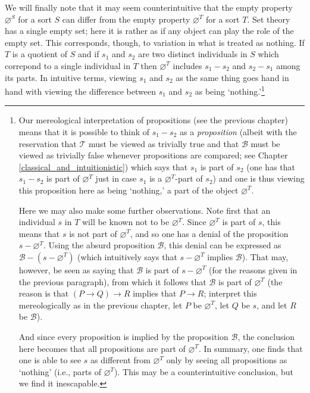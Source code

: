 \documentclass[12pt]{book}
\begin{document}
We will finally note that it may seem counterintuitive that the empty property $\varnothing^S$ for a sort $S$ can differ from the empty property $\varnothing^T$ for a sort $T$. Set theory has a single empty set; here it is rather as if any object can play the role of the empty set. This corresponds, though, to variation in what is treated as nothing. If $T$ is a quotient of $S$ and if $s_1$ and $s_2$ are two distinct individuals in $S$ which correpond to a single individual in $T$ then $\varnothing^T$ includes $s_1 - s_2$ and $s_2 - s_1$ among its parts. In intuitive terms, viewing $s_1$ and $s_2$ as the same thing goes hand in hand with viewing the difference between $s_1$ and $s_2$ as being `nothing.'\footnote{Our mereological interpretation of propositions (see the previous chapter) means that it is possible to think of $s_1 - s_2$ as a \textit{proposition} (albeit with the reservation that $\mathcal{T}$ must be viewed as trivially true and that $\mathcal{B}$ must be viewed as trivially false whenever propositions are compared; see Chapter \ref{classical_and_intuitionistic}) which says that $s_1$ is part of $s_2$ (one has that $s_1 - s_2$ is part of $\varnothing^T$ just in case $s_1$ is a $\varnothing^T$-part of $s_2$) and one is thus viewing this proposition here as being `nothing,' a part of the object $\varnothing^T$.

Here we may also make some further observations. Note first that an individual $s$ in $T$ will be known not to be $\varnothing^T$. Since $\varnothing^T$ is part of $s$, this means that $s$ is not part of $\varnothing^T$, and so one has a denial of the proposition $s - \varnothing^T$. Using the absurd proposition $\mathcal{B}$, this denial can be expressed as $\mathcal{B} - (s - \varnothing^T)$ (which intuitively says that $s - \varnothing^T$ implies $\mathcal{B}$). That may, however, be seen as saying that $\mathcal{B}$ is part of $s - \varnothing^T$ (for the reasons given in the previous paragraph), from which it follows that $\mathcal{B}$ is part of $\varnothing^T$ (the reason is that $(P \rightarrow Q) \rightarrow R$ implies that $P \rightarrow R$; interpret this mereologically as in the previous chapter, let $P$ be $\varnothing^T$, let $Q$ be $s$, and let $R$ be $\mathcal{B}$). 

And since every proposition is implied by the proposition $\mathcal{B}$, the conclusion here becomes that all propositions are part of $\varnothing^T$. In summary, one finds that one is able to see $s$ as different from $\varnothing^T$ only by seeing all propositions as `nothing' (i.e., parts of $\varnothing^T$). This may be a counterintuitive conclusion, but we find it inescapable.}
\end{document}
